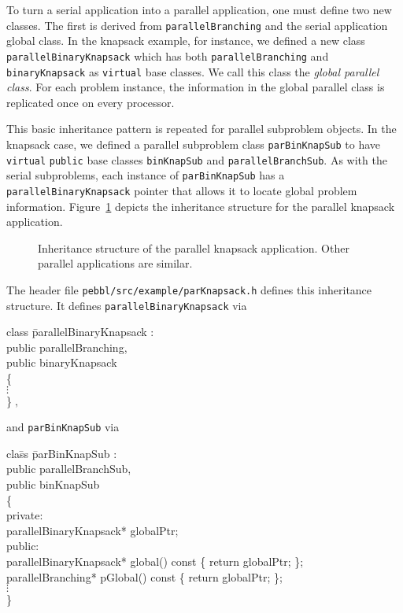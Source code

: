To turn a serial application into a parallel application, one must
define two new classes.  The first is derived from
\texttt{parallelBranching} and the serial application global class.
In the knapsack example, for instance, we defined a new class
\texttt{parallelBinaryKnapsack} which has both
\texttt{parallelBranching} and \texttt{binaryKnapsack} as
\texttt{virtual} base classes.  We call this class the \emph{global
parallel class}.  For each problem instance, the information in the
global parallel class is replicated once on every processor.

This basic inheritance pattern is repeated for
parallel subproblem objects.  In the knapsack case, we defined a
parallel subproblem class \texttt{parBinKnapSub} to have
\texttt{virtual} \texttt{public} base classes \texttt{binKnapSub} and
\texttt{parallelBranchSub}.  As with the serial subproblems, each
instance of \texttt{parBinKnapSub} has a
\texttt{parallelBinaryKnapsack} pointer that allows it to locate
global problem information.  Figure~\ref{fig:parinherit} depicts the
inheritance structure for the parallel knapsack application.

\begin{figure}[tb]
\begin{center}
\vspace{-0.2in}
\end{center}
\caption{Inheritance structure of the parallel knapsack application.
Other parallel applications are similar.}
\label{fig:parinherit}
\end{figure}

The header file \texttt{pebbl/src/example/parKnapsack.h} defines this
inheritance structure.  It defines \texttt{parallelBinaryKnapsack} via
\begin{codeblock}
class \=parallelBinaryKnapsack : \\
\>public parallelBranching, \\
\>public binaryKnapsack \\
\{ \\
\>$\vdots$\\
\}$\;,$\\
\end{codeblock}
and \texttt{parBinKnapSub} via
\begin{codeblock}
cla\=ss \=parBinKnapSub : \\
\>\>public parallelBranchSub, \\
\>\>public binKnapSub \\
\{ \\
private: \\
\>parallelBinaryKnapsack* globalPtr; \\
public: \\
\>parallelBinaryKnapsack* global()  const \{ return globalPtr; \}; \\
\>parallelBranching*      pGlobal() const \{ return globalPtr; \}; \\
\>\>$\vdots$\\
\}
\end{codeblock}

